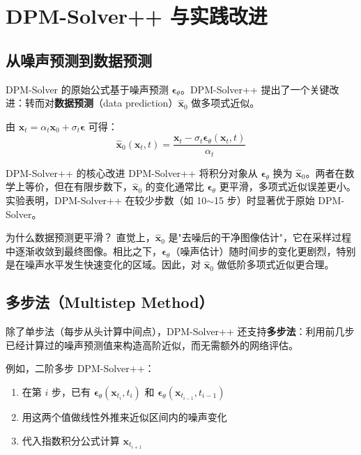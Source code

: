 \section{DPM-Solver++ 与实践改进}

\subsection{从噪声预测到数据预测}

DPM-Solver 的原始公式基于噪声预测 $\boldsymbol{\epsilon}_\theta$。DPM-Solver++ 提出了一个关键改进：转而对\textbf{数据预测}（data prediction）$\hat{\mathbf{x}}_0$ 做多项式近似。

由 $\mathbf{x}_t = \alpha_t \mathbf{x}_0 + \sigma_t \boldsymbol{\epsilon}$ 可得：
$$\hat{\mathbf{x}}_0(\mathbf{x}_t, t) = \frac{\mathbf{x}_t - \sigma_t \boldsymbol{\epsilon}_\theta(\mathbf{x}_t, t)}{\alpha_t}$$

\begin{importantbox}{DPM-Solver++ 的核心改进}
DPM-Solver++ 将积分对象从 $\boldsymbol{\epsilon}_\theta$ 换为 $\hat{\mathbf{x}}_0$。两者在数学上等价，但在有限步数下，$\hat{\mathbf{x}}_0$ 的变化通常比 $\boldsymbol{\epsilon}_\theta$ 更平滑，多项式近似误差更小。实验表明，DPM-Solver++ 在较少步数（如 10$\sim$15 步）时显著优于原始 DPM-Solver。
\end{importantbox}

\begin{knowledgebox}{为什么数据预测更平滑？}
直觉上，$\hat{\mathbf{x}}_0$ 是"去噪后的干净图像估计"，它在采样过程中逐渐收敛到最终图像。相比之下，$\boldsymbol{\epsilon}_\theta$（噪声估计）随时间步的变化更剧烈，特别是在噪声水平发生快速变化的区域。因此，对 $\hat{\mathbf{x}}_0$ 做低阶多项式近似更合理。
\end{knowledgebox}

\subsection{多步法（Multistep Method）}

除了单步法（每步从头计算中间点），DPM-Solver++ 还支持\textbf{多步法}：利用前几步已经计算过的噪声预测值来构造高阶近似，而无需额外的网络评估。

例如，二阶多步 DPM-Solver++：
\begin{enumerate}
    \item 在第 $i$ 步，已有 $\boldsymbol{\epsilon}_\theta(\mathbf{x}_{t_i}, t_i)$ 和 $\boldsymbol{\epsilon}_\theta(\mathbf{x}_{t_{i-1}}, t_{i-1})$
    \item 用这两个值做线性外推来近似区间内的噪声变化
    \item 代入指数积分公式计算 $\mathbf{x}_{t_{i+1}}$
\end{enumerate}

